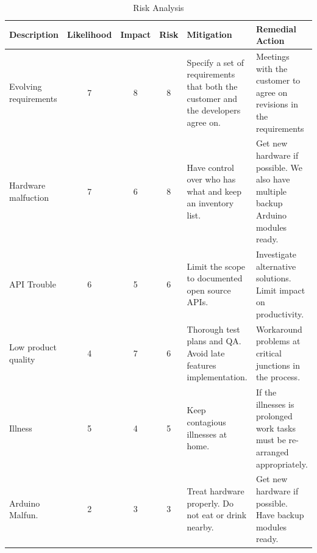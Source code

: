\begin{table}
	\begin{center}
		\caption{Risk Analysis}
		\begin{tabular}{| p{2.1cm} | c | c | c | p{2.8cm} | p{3cm} |}
		\hline

\textbf{Description} & \textbf{Likelihood} & \textbf{Impact} & \textbf{Risk} & \textbf{Mitigation} & \textbf{Remedial Action}\\ \hline

Evolving requirements	& 7 & 8 & 8
			& Specify a set of requirements that both the customer and the developers agree on.
			& Meetings with the customer to agree on revisions in the requirements \\ \hline

Hardware malfuction	& 7 & 6 & 8
			& Have control over who has what and keep an inventory list.
			& Get new hardware if possible. We also have multiple backup Arduino modules ready. \\ \hline

API Trouble	& 6 & 5 & 6
			& Limit the scope to documented open source APIs.
			& Investigate alternative solutions. Limit impact on productivity. \\ \hline

Low product quality	& 4 & 7 & 6
			& Thorough test plans and QA. Avoid late features implementation.
			&  Workaround problems at critical junctions in the process.\\ \hline
			
Illness 		& 5 & 4 & 5
			& Keep contagious illnesses at home.
			& If the illnesses is prolonged work tasks must be re-arranged appropriately. \\ \hline

Arduino Malfun.		& 2 & 3 & 3
			& Treat hardware properly. Do not eat or drink nearby.
			& Get new hardware if possible. Have backup modules ready. \\ \hline


			

		\end{tabular}
	\end{center}	
	\label{table:riskanalysis}
\end{table}

